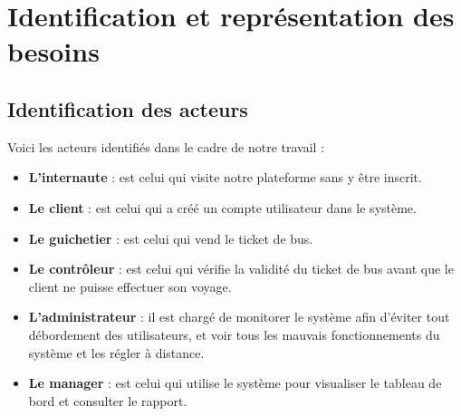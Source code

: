 \section[Identification et représentation des besoins]{Identification et représentation des besoins}    
    \subsection[Identification des acteurs]{Identification des acteurs}
    Voici les acteurs identifiés dans le cadre de notre
    travail :
    \par
        \begin{itemize}
            \setlength{\itemsep}{0pt}
            \item [\ding{226}] \textbf{L’internaute} : est celui qui visite
            notre plateforme sans y être inscrit.
            \item [\ding{226}] \textbf{Le client} : est celui qui a créé un compte
            utilisateur dans le système.
            \item [\ding{226}] \textbf{Le guichetier} : est celui qui vend le ticket de bus.
            \item [\ding{226}] \textbf{Le contrôleur} : est celui qui vérifie la validité
            du ticket de bus avant que le client ne puisse effectuer son voyage.
            \item [\ding{226}] \textbf{L’administrateur} : il est chargé de
            monitorer le système afin d’éviter tout débordement des utilisateurs,
            et voir tous les mauvais fonctionnements du système et les régler
            à distance.
            \item [\ding{226}] \textbf{Le manager} : est celui qui utilise le système
            pour visualiser le tableau de bord et consulter le rapport. 
        \end{itemize}
